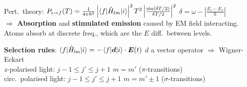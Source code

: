 \begin{squishlist}
    \item Pert.\ theory: $P_{i\rightarrow f}(T) = \frac{1}{4\pi \hbar^2} \left|\braket{f|\hat{H}_{lm}|i}\right|^2 T^2 \left|\frac{\sin(\delta T / 2)}{\delta T / 2}\right|^2$ \quad $\delta = \omega - \left|\frac{E_i - E_f}{\hbar}\right|$ \\
    $\Longrightarrow$ \textbf{Absorption} and \textbf{stimulated emission} caused by EM field interacting. \\
    Atoms absorb at discrete freq., which are the $E$ diff.\ between levels.
    \item \textbf{Selection rules}: $\braket{f|\hat{H}_{\text{lm}}|i} = - \braket{f| \bm{d}|i} \cdot \bm{E}(t)$ \quad $d$ a vector operator $\Rightarrow$ Wigner-Eckart \\
    $z$-polarised light: \quad $j-1 \leq j' \leq j+1$ \quad $m = m'$ \quad ($\pi$-transitions) \\
    circ.\ polarised light: \quad $j-1 \leq j' \leq j+1$ \quad $m = m' \pm 1$ \quad ($\sigma$-transitions)
\end{squishlist}

